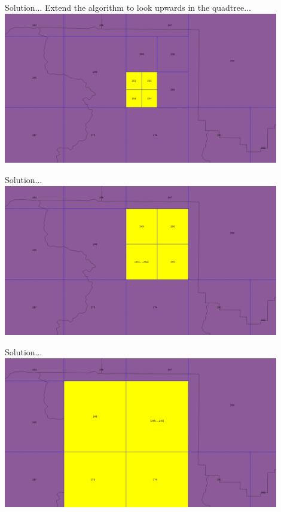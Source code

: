\documentclass{beamer}
\begin{document}
\begin{frame}{Solution...}
    Extend the algorithm to look upwards in the quadtree...
	\centering
	\includegraphics[trim=1cm 0 1cm 0, clip, width=0.9\textwidth]{figures/EmptyCells3}
\end{frame}
\begin{frame}{Solution...}
	\centering
	\includegraphics[trim=1cm 0 1cm 0, clip, width=0.9\textwidth]{figures/EmptyCells4}
\end{frame}
\begin{frame}{Solution...}
	\centering
	\includegraphics[trim=1cm 0 1cm 0, clip, width=0.9\textwidth]{figures/EmptyCells5}
\end{frame}
\end{document}

